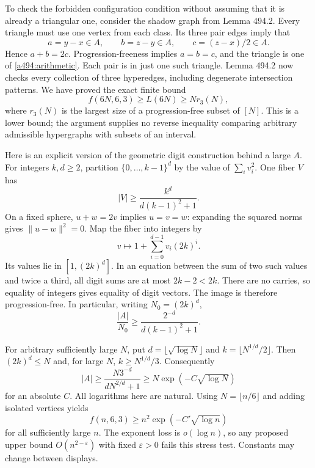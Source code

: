 \documentclass[11pt]{article}
\begin{document}
To check the forbidden configuration condition without assuming that it is
already a triangular one, consider the shadow graph from Lemma 494.2.
Every triangle must use one vertex from each class. Its three pair edges
imply that
\[
 a=y-x\in A,\qquad b=z-y\in A,\qquad c=(z-x)/2\in A.
\]
Hence $a+b=2c$. Progression-freeness implies $a=b=c$, and the triangle is
one of \eqref{a494:arithmetic}. Each pair is in just one such triangle.
Lemma 494.2 now checks every collection of three hyperedges, including
degenerate intersection patterns. We have proved the exact finite bound
\begin{equation}\label{a494:r3}
 f(6N,6,3)\geq L(6N)\geq N r_3(N),
\end{equation}
where $r_3(N)$ is the largest size of a progression-free subset of $[N]$.
This is a lower bound; the argument supplies no reverse inequality comparing
arbitrary admissible hypergraphs with subsets of an interval.

Here is an explicit version of the geometric digit construction behind a
large $A$. For integers $k,d\geq2$, partition $\{0,\ldots,k-1\}^d$ by
the value of $\sum_i v_i^2$. One fiber $V$ has
\[
 |V|\geq\frac{k^d}{d(k-1)^2+1}.
\]
On a fixed sphere, $u+w=2v$ implies $u=v=w$: expanding the squared norms
gives $\|u-w\|^2=0$. Map the fiber into integers by
\[
                 v\longmapsto 1+\sum_{i=0}^{d-1}v_i(2k)^i.
\]
Its values lie in $[1,(2k)^d]$. In an equation between the sum of two
such values and twice a third, all digit sums are at most $2k-2<2k$.
There are no carries, so equality of integers gives equality of digit
vectors. The image is therefore progression-free. In particular, writing
$N_0=(2k)^d$,
\begin{equation}\label{a494:digitbound}
        \frac{|A|}{N_0}\geq
        \frac{2^{-d}}{d(k-1)^2+1}.
\end{equation}

For arbitrary sufficiently large $N$, put $d=\lfloor\sqrt{\log N}\rfloor$
and $k=\lfloor N^{1/d}/2\rfloor$. Then $(2k)^d\leq N$ and, for large
$N$, $k\geq N^{1/d}/3$. Consequently
\[
 |A|\geq\frac{N3^{-d}}{dN^{2/d}+1}
                 \geq N\exp(-C\sqrt{\log N})
\]
for an absolute $C$. All logarithms here are natural. Using
$N=\lfloor n/6\rfloor$ and adding isolated vertices yields
\begin{equation}\label{a494:lower}
                  f(n,6,3)\geq
                  n^2\exp(-C'\sqrt{\log n})
\end{equation}
for all sufficiently large $n$. The exponent loss is $o(\log n)$, so any
proposed upper bound $O(n^{2-\varepsilon})$ with fixed $\varepsilon>0$
fails this stress test. Constants may change between displays.
\end{document}
